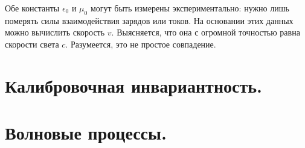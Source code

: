 \documentclass[11pt,a4paper]{article}
\numberwithin{equation}{section}
\newcommand{\eps}{\epsilon}
\begin{document}
Обе константы $\eps_0$ и $\mu_0$ могут быть измерены
экспериментально: нужно лишь померять силы взаимодействия зарядов или
токов. На основании этих данных можно вычислить скорость
$v$. Выясняется, что она с огромной точностью равна скорости света
$c$. Разумеется, это не простое совпадение. 

\section{Калибровочная инвариантность.}
\label{sec:gauge}

\section{Волновые процессы.}
\label{sec:waves}
\end{document}

